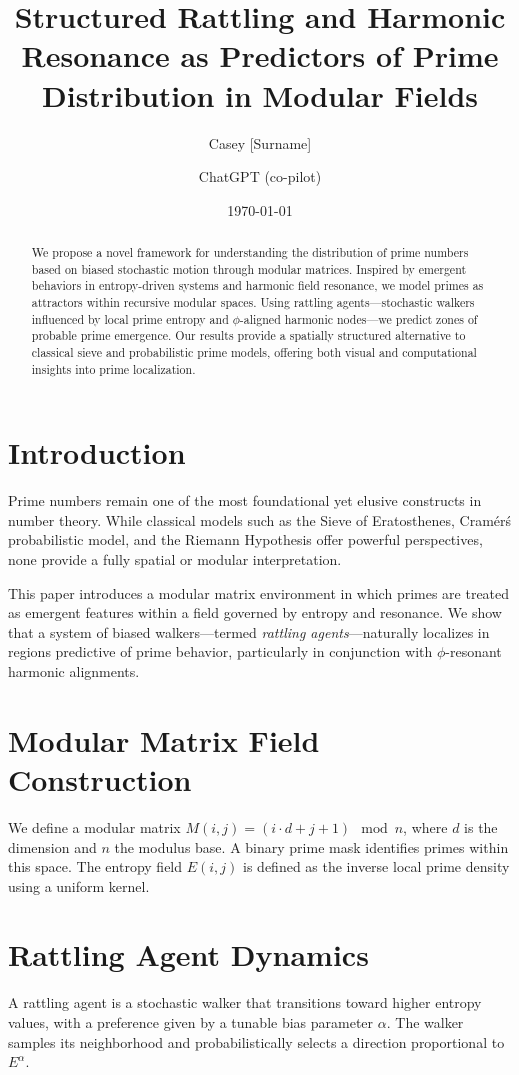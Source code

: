 \documentclass[12pt]{article}
\title{Structured Rattling and Harmonic Resonance as Predictors of Prime Distribution in Modular Fields}
\author{Casey [Surname] \and ChatGPT (co-pilot)}
\date{\today}
\begin{document}
\maketitle

\begin{abstract}
We propose a novel framework for understanding the distribution of prime numbers based on biased stochastic motion through modular matrices. Inspired by emergent behaviors in entropy-driven systems and harmonic field resonance, we model primes as attractors within recursive modular spaces. Using rattling agents---stochastic walkers influenced by local prime entropy and $\phi$-aligned harmonic nodes---we predict zones of probable prime emergence. Our results provide a spatially structured alternative to classical sieve and probabilistic prime models, offering both visual and computational insights into prime localization.
\end{abstract}

\section{Introduction}
Prime numbers remain one of the most foundational yet elusive constructs in number theory. While classical models such as the Sieve of Eratosthenes, Cram\'er\'s probabilistic model, and the Riemann Hypothesis offer powerful perspectives, none provide a fully spatial or modular interpretation.

This paper introduces a modular matrix environment in which primes are treated as emergent features within a field governed by entropy and resonance. We show that a system of biased walkers---termed \textit{rattling agents}---naturally localizes in regions predictive of prime behavior, particularly in conjunction with $\phi$-resonant harmonic alignments.

\section{Modular Matrix Field Construction}
We define a modular matrix $M(i,j) = (i \cdot d + j + 1) \mod n$, where $d$ is the dimension and $n$ the modulus base. A binary prime mask identifies primes within this space. The entropy field $E(i,j)$ is defined as the inverse local prime density using a uniform kernel.

\section{Rattling Agent Dynamics}
A rattling agent is a stochastic walker that transitions toward higher entropy values, with a preference given by a tunable bias parameter $\alpha$. The walker samples its neighborhood and probabilistically selects a direction proportional to $E^\alpha$.
\end{document}
